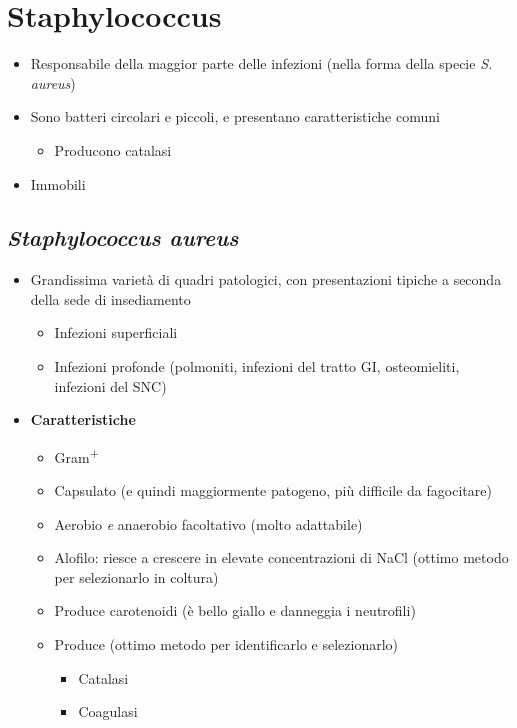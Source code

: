 \documentclass[italian,]{article}
\providecommand{\tightlist}{%
  \setlength{\itemsep}{0pt}\setlength{\parskip}{0pt}}
\begin{document}
\hypertarget{staphylococcus}{%
\section{Staphylococcus}\label{staphylococcus}}

\begin{itemize}
\tightlist
\item
  Responsabile della maggior parte delle infezioni (nella forma della
  specie \emph{S. aureus})
\item
  Sono batteri circolari e piccoli, e presentano caratteristiche comuni

  \begin{itemize}
  \tightlist
  \item
    Producono catalasi
  \end{itemize}
\item
  Immobili
\end{itemize}

\hypertarget{staphylococcus-aureus}{%
\subsection{\texorpdfstring{\emph{Staphylococcus
aureus}}{Staphylococcus aureus}}\label{staphylococcus-aureus}}

\begin{itemize}
\tightlist
\item
  Grandissima varietà di quadri patologici, con presentazioni tipiche a
  seconda della sede di insediamento

  \begin{itemize}
  \tightlist
  \item
    Infezioni superficiali
  \item
    Infezioni profonde (polmoniti, infezioni del tratto GI,
    osteomieliti, infezioni del SNC)
  \end{itemize}
\item
  \textbf{Caratteristiche}

  \begin{itemize}
  \tightlist
  \item
    Gram\textsuperscript{+}
  \item
    Capsulato (e quindi maggiormente patogeno, più difficile da
    fagocitare)
  \item
    Aerobio \emph{e} anaerobio facoltativo (molto adattabile)
  \item
    Alofilo: riesce a crescere in elevate concentrazioni di NaCl (ottimo
    metodo per selezionarlo in coltura)
  \item
    Produce carotenoidi (è bello giallo e danneggia i neutrofili)
  \item
    Produce (ottimo metodo per identificarlo e selezionarlo)

    \begin{itemize}
    \tightlist
    \item
      Catalasi
    \item
      Coagulasi
    \end{itemize}
  \end{itemize}
\end{itemize}
\end{document}
